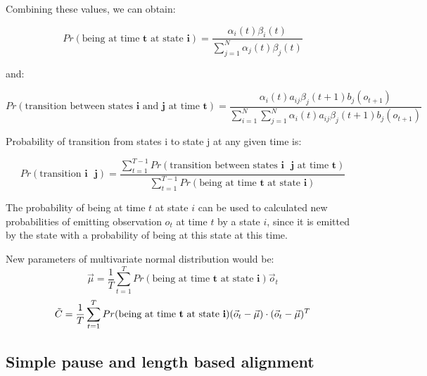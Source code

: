 \documentclass[12pt,a4paper,english]{article}
\begin{document}
\newpage

Combining these values, we can obtain:

\begin{equation}
    Pr(\text{being at time $\boldsymbol{t}$ at state $\boldsymbol{i}$}) = \frac {\alpha_i(t)\beta_i(t)} {\sum_{j=1}^{N} \alpha_j(t)\beta_j(t) }
\end{equation}
	
and:
	
\begin{equation}
    Pr(\text{transition between states $\boldsymbol{i}$ and $\boldsymbol{j}$ at time $\boldsymbol{t}$}) = \frac {\alpha_i(t)a_{ij}\beta_j(t + 1)b_j(o_{t+1})} {\sum_{i=1}^{N} \sum_{j=1}^{N} \alpha_i(t)a_{ij}\beta_j(t + 1)b_j(o_{t+1})}
\end{equation}

Probability of transition from states i to state j at any given time is:
	
\begin{equation}
    Pr(\text{transition $\boldsymbol{i}$ $\boldsymbol{j}$}) = \frac {\sum_{t=1}^{T-1} Pr(\text{transition between states $\boldsymbol{i}$ $\boldsymbol{j}$ at time $\boldsymbol{t}$})} {\sum_{t=1}^{T-1} Pr(\text{being at time $\boldsymbol{t}$ at state $\boldsymbol{i}$}) }
\end{equation}
	

The probability of being at time $t$ at state $i$ can be used to calculated new probabilities of emitting observation $o_t$ at time $t$ by a state $i$,
since it is emitted by the state with a probability of being at this state at this time. \newline

New parameters of multivariate normal distribution would be:
\begin{equation}
    \vec \mu = \frac 1 T \sum_{t=1}^{T} Pr(\text{being at time $\boldsymbol{t}$ at state $\boldsymbol{i}$}) \vec o_t
\end{equation}
\begin{equation}
    \tilde C = \frac 1 T \sum_{t=1}^{T} Pr(\text{being at time $\bold{t}$ at state $\bold{i}$})(\vec o_t - \vec \mu) \cdot (\vec o_t - \vec \mu)^T
\end{equation}


\newpage
\begin{center}
    \section{Simple pause and length based alignment}
\end {center}
\setcounter{equation}{0}
\end{document}
